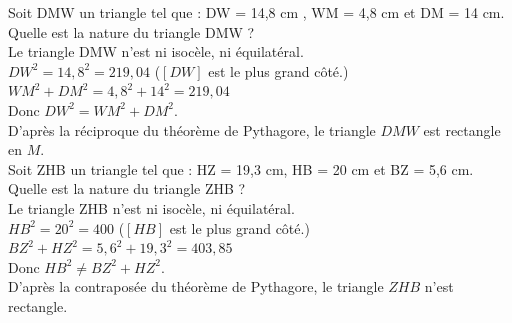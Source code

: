 \documentclass[12pt]{article}
\begin{document}
\begin{multicols}{2}
Soit DMW un triangle tel que : DW = 14,8 cm , WM = 4,8 cm et DM = 14 cm.\\
Quelle est la nature du triangle DMW ?\\

Le triangle DMW n’est ni isocèle, ni équilatéral.\\
$DW^2 = 14,8^2 = 219,04$ ($[DW]$ est le plus grand côté.) \\
$WM^2 + DM^2 = 4,8^2 + 14^2 = 219,04$\\
Donc $DW^2 = WM^2 + DM^2$.\\

D’après la réciproque du théorème de Pythagore, le triangle $DMW$ est rectangle en $M$.\\


Soit ZHB un triangle tel que : HZ = 19,3 cm, HB = 20 cm et BZ = 5,6 cm.\\
Quelle est la nature du triangle ZHB ?\\

Le triangle ZHB n’est ni isocèle, ni équilatéral.\\
$HB^2 = 20^2 = 400$  ($[HB]$ est le plus grand côté.)\\
$BZ^2 + HZ^2 = 5,6^2 + 19,3^2 = 403,85$\\
Donc $HB^2 \neq BZ^2 + HZ^2$.\\

D’après la contraposée du théorème de Pythagore, le triangle $ZHB$ n'est rectangle.\\
\end{multicols}
\end{document}
